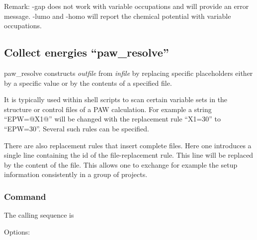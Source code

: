 \documentclass[final,12pt,makeidx,DIV=calc]{article}
\begin{document}
{{{{{{Remark: -gap does not work with variable occupations and will provide
an error message. -lumo and -homo will report the chemical potential
with variable occupations.
%
\subsection{Collect energies ``paw\_resolve''}
paw\_resolve constructs \textit{outfile} from \textit{infile} by
replacing specific placeholders either by a specific value or by the
contents of a specified file. 

It is typically used within shell scripts to scan certain variable
sets in the structure or control files of a PAW calculation.  For
example a string ``EPW=@X1@'' will be changed with the replacement
rule ``X1=30'' to ``EPW=30''. Several such rules can be specified.

There are also replacement rules that insert complete files. Here one
introduces a single line containing the id of the file-replacement
rule.  This line will be replaced by the content of the file. This
allows one to exchange for example the setup information consistently
in a group of projects.

\subsubsection{Command}
The calling sequence is

\bigskip{}
\vspace{0.5cm}

\noindent Options:\\[2mm]
\hspace*{1cm}
\bigskip
%
}}}}}}
\end{document}

